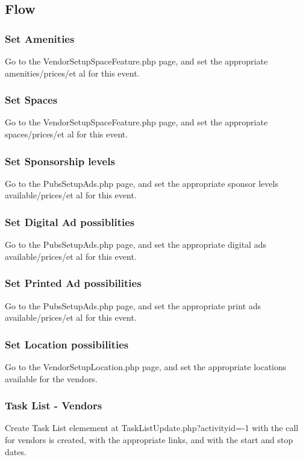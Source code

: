 \documentclass[captions=tablesignature]{scrartcl}
\begin{document}
\subsection{Flow}
\label{sec-3-2}
\subsubsection{Set Amenities}
\label{sec-3-2-1}
Go to the VendorSetupSpaceFeature.php page, and set the
appropriate amenities/prices/et al for this event.

\subsubsection{Set Spaces}
\label{sec-3-2-2}
Go to the VendorSetupSpaceFeature.php page, and set the
appropriate spaces/prices/et al for this event.

\subsubsection{Set Sponsorship levels}
\label{sec-3-2-3}
Go to the PubsSetupAds.php page, and set the
appropriate sponsor levels available/prices/et al for this event.

\subsubsection{Set Digital Ad possiblities}
\label{sec-3-2-4}
Go to the PubsSetupAds.php page, and set the
appropriate digital ads available/prices/et al for this event.

\subsubsection{Set Printed Ad possibilities}
\label{sec-3-2-5}
Go to the PubsSetupAds.php page, and set the
appropriate print ads available/prices/et al for this event.

\subsubsection{Set Location possibilities}
\label{sec-3-2-6}
Go to the VendorSetupLocation.php page, and set the appropriate
locations available for the vendors.

\subsubsection{Task List - Vendors}
\label{sec-3-2-7}
Create Task List elemement at TaskListUpdate.php?activityid=-1
with the call for vendors is created, with the appropriate links,
and with the start and stop dates.
\end{document}
